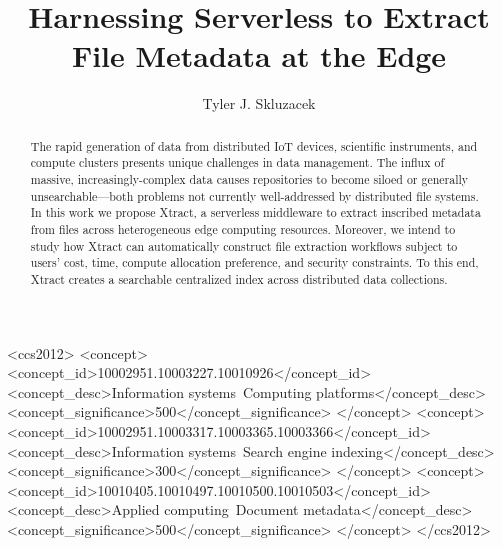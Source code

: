 \documentclass[sigconf, 9pt]{acmart}
\newcommand{\tyler}[1]{}
\newcommand{\tyler}[1]{{\textcolor{cyan}{ tyler: #1 }}}
\newcommand{\name}{Xtract}
\begin{document}
\title{Harnessing Serverless to Extract File Metadata at the Edge}


\author{Tyler J. Skluzacek} 



\renewcommand{\shortauthors}{Skluzacek et al.}

\begin{abstract}

\tyler{100 word limit}
The rapid generation of data from distributed IoT devices, scientific instruments, and compute clusters presents
unique challenges in data management. The influx of massive, increasingly-complex data causes repositories to become 
siloed or generally unsearchable---both problems not currently well-addressed by distributed file systems.  
In this work we propose \name{}, a serverless middleware 
to extract inscribed metadata from files across heterogeneous edge computing resources. Moreover, we intend to study how \name{} can
automatically construct file extraction workflows subject to users' cost, time, compute allocation preference, and security constraints. 
To this end, \name{} creates a searchable centralized index across distributed data collections.


\end{abstract}

\begin{CCSXML}
<ccs2012>
<concept>
<concept_id>10002951.10003227.10010926</concept_id>
<concept_desc>Information systems~Computing platforms</concept_desc>
<concept_significance>500</concept_significance>
</concept>
<concept>
<concept_id>10002951.10003317.10003365.10003366</concept_id>
<concept_desc>Information systems~Search engine indexing</concept_desc>
<concept_significance>300</concept_significance>
</concept>
<concept>
<concept_id>10010405.10010497.10010500.10010503</concept_id>
<concept_desc>Applied computing~Document metadata</concept_desc>
<concept_significance>500</concept_significance>
</concept>
</ccs2012>
\end{CCSXML}



\maketitle
\end{document}
